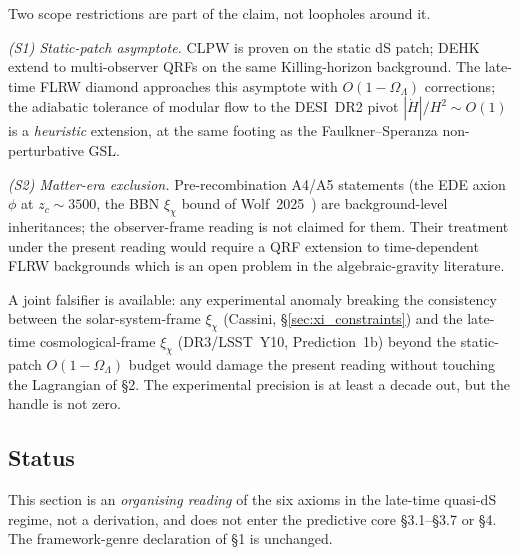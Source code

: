 Two scope restrictions are part of the claim, not loopholes around it.

\emph{(S1) Static-patch asymptote.} CLPW is proven on the static dS
patch; DEHK extend to multi-observer QRFs on the same Killing-horizon
background. The late-time FLRW diamond approaches this asymptote with
$O(1-\Omega_\Lambda)$ corrections; the adiabatic tolerance of modular
flow to the DESI~DR2 pivot $|\dot H|/H^2 \sim O(1)$ is a \emph{heuristic}
extension, at the same footing as the Faulkner--Speranza
non-perturbative GSL.

\emph{(S2) Matter-era exclusion.} Pre-recombination A4/A5 statements
(the EDE axion $\phi$ at $z_c\sim 3500$, the BBN $\xi_\chi$ bound of
Wolf~2025~\cite{Wolf2025}) are background-level inheritances; the
observer-frame reading is not claimed for them. Their treatment under
the present reading would require a QRF extension to time-dependent FLRW
backgrounds which is an open problem in the algebraic-gravity
literature.

A joint falsifier is available: any experimental anomaly breaking the
consistency between the solar-system-frame $\xi_\chi$ (Cassini,
\S\ref{sec:xi_constraints}) and the late-time cosmological-frame
$\xi_\chi$ (DR3/LSST~Y10, Prediction~1b) beyond the static-patch
$O(1-\Omega_\Lambda)$ budget would damage the present reading without
touching the Lagrangian of \S2. The experimental precision is at least a
decade out, but the handle is not zero.

\subsection*{Status}

This section is an \emph{organising reading} of the six axioms in the
late-time quasi-dS regime, not a derivation, and does not enter the
predictive core \S3.1--\S3.7 or \S4. The framework-genre declaration of
\S1 is unchanged.

